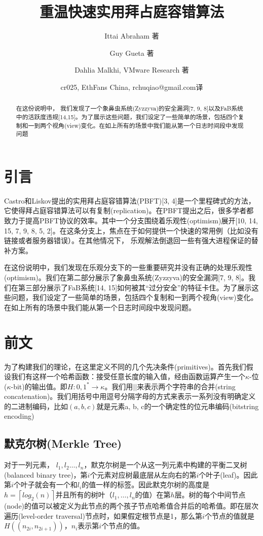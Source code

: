 \documentclass[UTF8]{ctexart}
\title{重温快速实用拜占庭容错算法}
\author{Ittai Abraham 著 \and Guy Gueta 著 \and Dahlia Malkhi, VMware Research 著 \and cr025, EthFans China, rchuqiao@gmail.com译}
\def\lc{\left\lceil}
\def\rc{\right\rceil}
\begin{document}
\maketitle

\begin{abstract}
在这份说明中， 我们发现了一个象鼻虫系统(Zyzzyva)的安全漏洞[7, 9, 8]以及FaB系统中的活跃度违规[14,15]。为了展示这些问题，我们设定了一些简单的场景，包括四个复制和一到两个视角(view)变化。在如上所有的场景中我们能从第一个日志时间段中发现问题
\end{abstract}

\section{引言}
Castro和Liskov提出的实用拜占庭容错算法(PBFT)[3, 4]是一个里程碑式的方法，它使得拜占庭容错算法可以有复制(replication)。在PBFT提出之后，很多学者都致力于提高PBFT协议的效率。其中一个分支围绕着乐观性(optimism)展开[10, 14, 15, 7, 9, 8, 5, 2]。在这条分支上，焦点在于如何提供一个快速的常用例（比如没有链接或者服务器错误）。在其他情况下， 乐观解法倒退回一些有强大进程保证的替补方案。

在这份说明中，我们发现在乐观分支下的一些重要研究并没有正确的处理乐观性(optimism)。我们在第二部分展示了象鼻虫系统(Zyzzyva)的安全漏洞[7, 9, 8]。我们在第三部分展示了FaB系统[14, 15]如何被其“过分安全”的特征卡住。为了展示这些问题，我们设定了一些简单的场景，包括四个复制和一到两个视角(view)变化。在如上所有的场景中我们能从第一个日志时间段中发现问题。














\section{前文} \label{sec:firstpage}

为了构建我们的理论，在这里定义不同的几个先决条件(primitives)。首先我们假设我们有这样一个哈希函数：接受任意长度的输入值，经由函数运算产生一个$\kappa$-位($\kappa$-bit)的输出值。即$H: {0, 1}^* \to \kappa$。我们用$||$来表示两个字符串的合并(string concatenation)。我们用括号中用逗号分隔字母的方式来表示一系列没有明确定义的二进制编码，比如$(a, b, c)$就是元素a, b, c的一个确定性的位元串编码(bitstring encoding)

\subsection{默克尔树(Merkle Tree)}
对于一列元素， $l_1, l_2 \dots, l_n$，默克尔树是一个从这一列元素中构建的平衡二叉树(balanced binary tree)，第$i$个元素对应树最底层从左向右的第$i$个叶子(leaf)。因此第$i$个叶子就会有一个和$l_i$的值一样的标签。因此默克尔树的高度是$h = \lc log_2(n)\rc$并且所有的树叶（$l_1, \dots, l_n$的值）在第$h$层。树的每个中间节点(node)的值可以被定义为此节点的两个孩子节点哈希值合并后的哈希值。即在层次遍历(level-order traversal)节点时，如果假定根节点是1，那么第$i$个节点的值就是$H((n_{2i}, n_{2i + 1}))$，$n_i$表示第$i$个节点的值。
\end{document}
